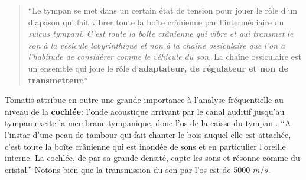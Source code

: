     \begin{quotation}
    	``Le tympan se met dans un certain état de tension pour jouer le
    	rôle d'un diapason qui fait vibrer toute la boîte crânienne
    	par l'intermédiaire du \emph{sulcus tympani}.
    	\emph{C'est toute la boîte crânienne qui vibre et qui transmet le son à
    la vésicule labyrinthique et non à la chaîne ossiculaire que l'on a l'habitude
    de considérer comme le véhicule du son.} La chaîne ossiculaire est un ensemble
    qui
    	joue le rôle d'\textbf{adaptateur, de régulateur et non de transmetteur}.'' \autocite {tomatis_conf1972}

    \end{quotation}



     Tomatis attribue en outre une grande importance à l'analyse
         fréquentielle au niveau de la\textbf{ cochlée}:
l'onde acoustique arrivant par le canal auditif
jusqu'au tympan  excite la membrane tympanique, donc l'os de la caisse
du tympan \autocite {tomatis_conf1972}.%
\enquote   {A l'instar d'une
peau de tambour qui fait chanter le bois auquel elle est attachée,
c'est toute la boîte crânienne qui est inondée de sons et en particulier
l'oreille interne. La cochlée, de par sa grande densité, capte les sons
et résonne comme du cristal.} Notons bien que la transmission du son par l'os est de
5000 $m/s$.


